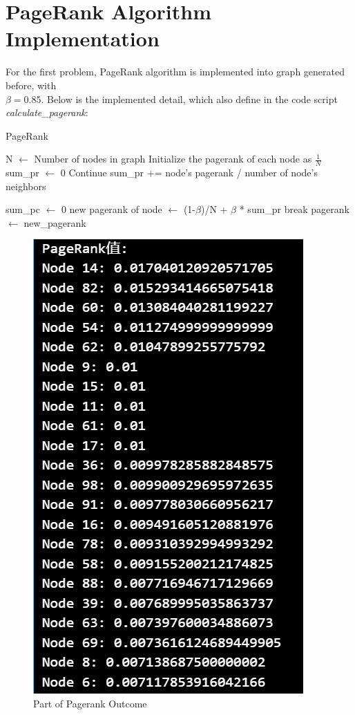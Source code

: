 \documentclass{article}
\begin{document}
	\section*{PageRank Algorithm Implementation}
	For the first problem, PageRank algorithm is implemented into graph generated before, with \\$\beta = 0.85$. Below is the implemented detail, which also define in the code script \textit{calculate\_pagerank}:\\
	
	\begin{algorithm}
		\caption{PageRank}\label{alg:pagerank}
		\begin{algorithmic}
			\State N $\gets $ Number of nodes in graph
			\State Initialize the pagerank of each node as $\frac{1}{N}$
					\State sum\_pr $\gets$ 0 
								\State Continue
							\EndIf
							\State sum\_pr += node's pagerank / number of node's neighbors
						
						\EndFor
					\Else
						\State sum\_pc $\gets$ 0
					\EndIf
				\State new pagerank of node $\gets$ (1-$\beta$)/N + $\beta$ * sum\_pr
				\EndFor
				\State break
			\EndIf
			\State pagerank $\gets$ new\_pagerank
			\EndFor
		\end{algorithmic}
	\end{algorithm}
	
	\begin{figure}[H]
		\centering
		\includegraphics[scale=0.5]{pagerank.png}
		\caption{Part of Pagerank Outcome}
	\end{figure}
	
\end{document}
